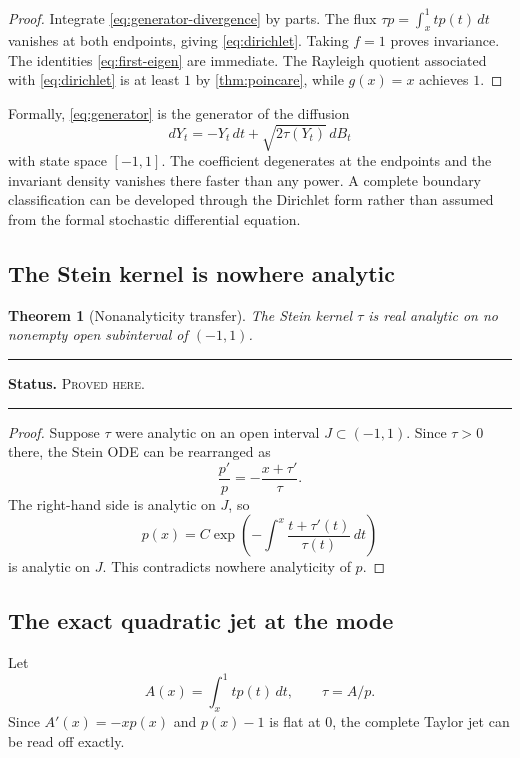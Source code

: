\documentclass[11pt,oneside]{article}
\newtheorem{theorem}{Theorem}[section]
\theoremstyle{definition}
\theoremstyle{remark}
\newenvironment{boxedremark}{%
  \par\smallskip\noindent\begin{center}\begin{minipage}{0.94\textwidth}%
  \color{black}\hrule\vspace{0.6em}\small
}{%
  \vspace{0.6em}\hrule\end{minipage}\end{center}\smallskip
}
\newcommand{\ProvedHere}{\textsc{Proved here}}
\newcommand{\Status}[1]{%
  \begin{boxedremark}\textbf{Status.} #1.\end{boxedremark}}
\begin{document}
\begin{proof}
Integrate \eqref{eq:generator-divergence} by parts.  The flux
$\tau p=\int_x^1tp(t)\,dt$ vanishes at both endpoints, giving
\eqref{eq:dirichlet}.  Taking $f=1$ proves invariance.  The identities
\eqref{eq:first-eigen} are immediate.  The Rayleigh quotient associated with
\eqref{eq:dirichlet} is at least $1$ by \cref{thm:poincare}, while $g(x)=x$
achieves $1$.
\end{proof}

Formally, \eqref{eq:generator} is the generator of the diffusion
\begin{equation}\label{eq:sde}
 dY_t=-Y_t\,dt+\sqrt{2\tau(Y_t)}\,dB_t
\end{equation}
with state space $[-1,1]$.  The coefficient degenerates at the endpoints and the
invariant density vanishes there faster than any power.  A complete boundary
classification can be developed through the Dirichlet form rather than assumed
from the formal stochastic differential equation.

\subsection{The Stein kernel is nowhere analytic}
\begin{theorem}[Nonanalyticity transfer]\label{thm:tau-nonanalytic}
The Stein kernel $\tau$ is real analytic on no nonempty open subinterval of
$(-1,1)$.
\end{theorem}
\Status{\ProvedHere}

\begin{proof}
Suppose $\tau$ were analytic on an open interval $J\subset(-1,1)$.  Since
$\tau>0$ there, the Stein ODE can be rearranged as
\begin{equation}\label{eq:p-analytic-ode}
 \frac{p'}p=-\frac{x+\tau'}{\tau}.
\end{equation}
The right-hand side is analytic on $J$, so
\[
 p(x)=C\exp\!\left(-\int^x\frac{t+\tau'(t)}{\tau(t)}\,dt\right)
\]
is analytic on $J$.  This contradicts nowhere analyticity of $p$.
\end{proof}

\subsection{The exact quadratic jet at the mode}
Let
\[
 A(x)=\int_x^1t p(t)\,dt,
 \qquad \tau=A/p.
\]
Since $A'(x)=-xp(x)$ and $p(x)-1$ is flat at $0$, the complete Taylor jet can be
read off exactly.
\end{document}

